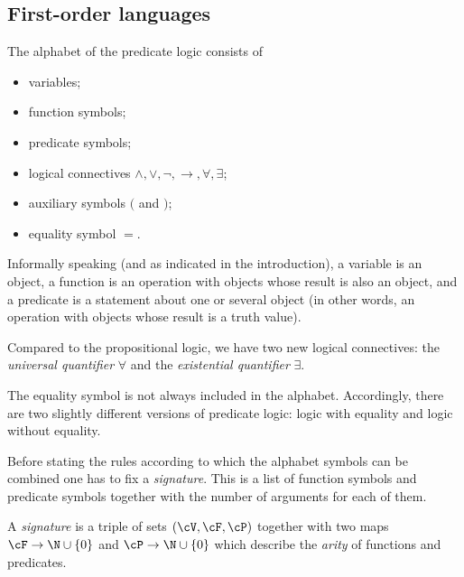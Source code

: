 \begin{page}
\subsection{First-order languages}
The alphabet of the predicate logic consists of
\begin{itemize}
\item
variables;
\item
function symbols;
\item
predicate symbols;
\item
logical connectives $\wedge, \vee, \neg, \to, \forall, \exists$;
\item
auxiliary symbols $($ and $)$;
\item
equality symbol $=$.
\end{itemize}

Informally speaking (and as indicated in the introduction), a variable is an object,
a function is an operation with objects whose result is also an object,
and a predicate is a statement about one or several object (in other words, an operation with objects whose result is a truth value).

Compared to the propositional logic, we have two new logical connectives:
the \emph{universal quantifier} $\forall$ and the \emph{existential quantifier} $\exists$.

The equality symbol is not always included in the alphabet.
Accordingly, there are two slightly different versions of predicate logic: logic with equality and logic without equality.

Before stating the rules according to which the alphabet symbols can be combined one has to fix a \emph{signature}.
This is a list of function symbols and predicate symbols together with the number of arguments for each of them.


\end{page}

\begin{page}

\begin{dfn}
A \emph{signature} is a triple of sets $(\cV, \cF, \cP)$ together with two maps $\cF \to \N \cup \{0\}$ and $\cP \to \N \cup \{0\}$
which describe the \emph{arity} of functions and predicates.
\end{dfn}

\end{page}

